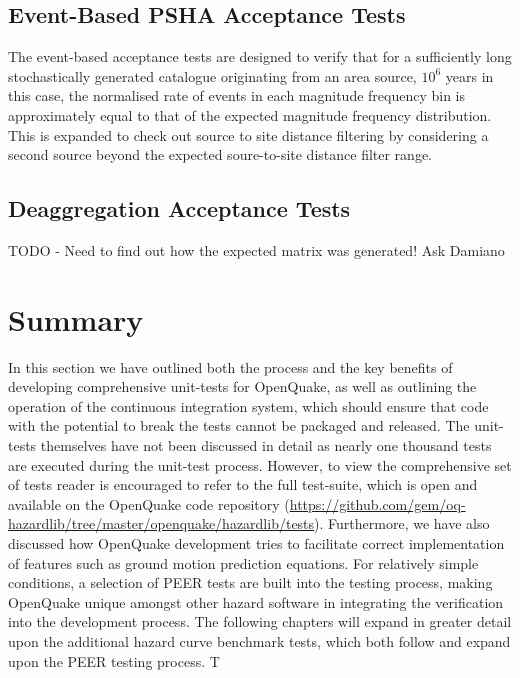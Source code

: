 \subsection{Event-Based PSHA Acceptance Tests}

The event-based acceptance tests are designed to verify that for a sufficiently long stochastically generated catalogue originating from an area source, $10^6$ years in this case, the normalised rate of events in each magnitude frequency bin is approximately equal to that of the expected magnitude frequency distribution. This is expanded to check out source to site distance filtering by considering a second source beyond the expected soure-to-site distance filter range. 

\subsection{Deaggregation Acceptance Tests}

TODO - Need to find out how the expected matrix was generated! Ask Damiano

\section{Summary}

In this section we have outlined both the process and the key benefits of developing comprehensive unit-tests for OpenQuake, as well as outlining the operation of the continuous integration system, which should ensure that code with the potential to break the tests cannot be packaged and released. The unit-tests themselves have not been discussed in detail as nearly one thousand tests are executed during the unit-test process. However, to view the comprehensive set of tests reader is encouraged to refer to the full test-suite, which is open and available on the OpenQuake code repository (\href{https://github.com/gem/oq-hazardlib/tree/master/openquake/hazardlib/tests}{https://github.com/gem/oq-hazardlib/tree/master/openquake/hazardlib/tests}). Furthermore, we have also discussed how OpenQuake development tries to facilitate correct implementation of features such as ground motion prediction equations. For relatively simple conditions, a selection of PEER tests \citep{thomas2010} are built into the testing process, making OpenQuake unique amongst other hazard software in integrating the verification into the development process. The following chapters will expand in greater detail upon the additional hazard curve benchmark tests, which both follow and expand upon the PEER testing process. T




